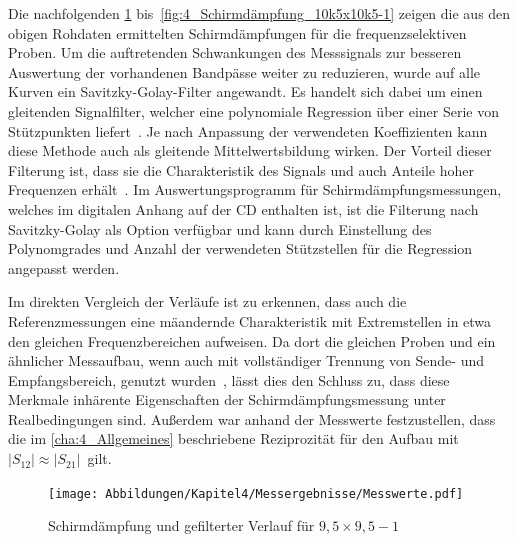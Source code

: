 


Die nachfolgenden \Abbildungen\ref{fig:4_Schirmdämpfung_9k5x9k5-1} bis~\ref{fig:4_Schirmdämpfung_10k5x10k5-1} zeigen die aus den obigen Rohdaten ermittelten Schirmdämpfungen für die frequenzselektiven Proben. Um die auftretenden Schwankungen des Messsignals zur besseren Auswertung der vorhandenen Bandpässe weiter zu reduzieren, wurde auf alle Kurven ein Savitzky-Golay-Filter angewandt. Es handelt sich dabei um einen gleitenden Signalfilter, welcher eine polynomiale Regression über einer Serie von Stützpunkten liefert~\cite{Savitzky-Golay-Filter_Original}. Je nach Anpassung der verwendeten Koeffizienten kann diese Methode auch als gleitende Mittelwertsbildung wirken. Der Vorteil dieser Filterung ist, dass sie die Charakteristik des Signals und auch Anteile hoher Frequenzen erhält~\cite{Savitzky-Golay-Filter_Original}. Im Auswertungsprogramm für Schirmdämpfungsmessungen, welches im digitalen Anhang auf der CD enthalten ist, ist die Filterung nach Savitzky-Golay als Option verfügbar und kann durch Einstellung des Polynomgrades und Anzahl der verwendeten Stützstellen für die Regression angepasst werden.
\par
\vspace{\linespace}
Im direkten Vergleich der Verläufe ist zu erkennen, dass auch die Referenzmessungen eine mäandernde Charakteristik mit Extremstellen in etwa den gleichen Frequenzbereichen aufweisen. Da dort die gleichen Proben und ein ähnlicher Messaufbau, wenn auch mit vollständiger Trennung von Sende- und Empfangsbereich, genutzt wurden~\cite{FSS_Toedter_Diplomarbeit}, lässt dies den Schluss zu, dass diese Merkmale inhärente Eigenschaften der Schirmdämpfungsmessung unter Realbedingungen sind. Außerdem war anhand der Messwerte festzustellen, dass die im \Abschnitt\ref{cha:4_Allgemeines} beschriebene Reziprozität für den Aufbau mit \mbox{$|S_{12}| \approx |S_{21}|$ gilt}.
\par
\vspace{\linespace}

\begin{figure}[H]
    \centering
    \texttt{[image: Abbildungen/Kapitel4/Messergebnisse/Messwerte.pdf]}
    \caption{Schirmdämpfung und gefilterter Verlauf für $9,5\times9,5-1$}
    \label{fig:4_Schirmdämpfung_9k5x9k5-1}
\end{figure}

